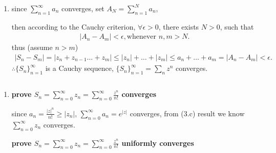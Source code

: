 \documentclass[a4paper]{article}
\begin{document}
\begin{enumerate}[label=(\alph*)]
    \item since $\sum_{n=1}^{\infty} a_n $ converges, set $A_N=\sum_{n=1}^{N} a_n $, 

        then according to the Cauchy criterion, $\forall \epsilon > 0$, there exists $N > 0$, such that
        \begin{align*}
            |A_n-A_m| < \epsilon, \text{whenever } n, m>N
        .\end{align*}
        thus (assume $n > m$)
        \begin{align*}
            |S_n-S_m| =|z_n+z_{n-1}\ldots +z_m|\le |z_n|+\ldots+|z_m|\le a_n+\ldots+a_m=|A_n-A_m|<\epsilon
        .\end{align*}
        $\therefore \{S_n\}_{n=1}^{\infty}$ is a Cauchy sequence, $\{S_n\}_{n=1}^{\infty}=\sum_{n} z^n$ converges.
\end{enumerate}

\subsection{}
\begin{enumerate}[label=(\alph*)]
    \item \textbf{prove $S_n=\sum_{n=0}^{\infty} z_{n}=\sum_{n=0}^{\infty} \frac{z^n}{n!}$ converges}

        since $a_n=\frac{|z|^n}{n!}\ge |z_n|$, $\sum_{n=0}^{\infty} a_n=e^{|z|}$ converges, from (3.c) result we know $\sum_{n=0}^{\infty} z_n$ converges.

        \textbf{prove $S_n=\sum_{n=0}^{\infty} z_{n}=\sum_{n=0}^{\infty} \frac{z^n}{n!}$ uniformly converges}


\end{enumerate}
\end{document}
